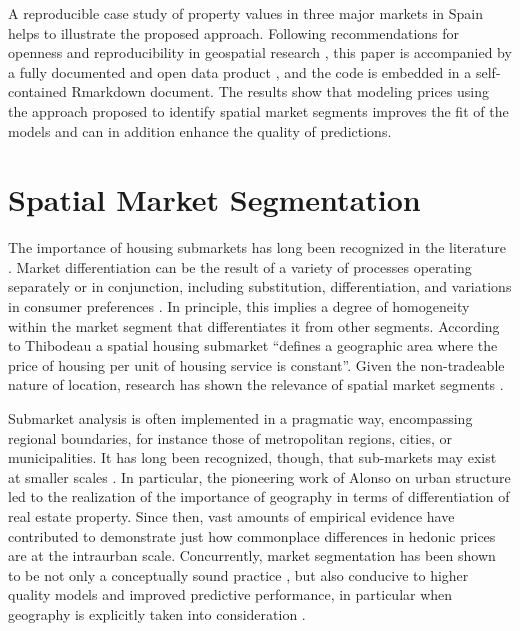 \documentclass[Royal,times,sageh]{sagej}
\begin{document}
A reproducible case study of property values in three major markets in
Spain helps to illustrate the proposed approach. Following
recommendations for openness and reproducibility in geospatial research
\citep{Paez2021open}, this paper is accompanied by a fully documented
and open data product \citep[see][]{arribas2021open}, and the code is
embedded in a self-contained Rmarkdown document. The results show that
modeling prices using the approach proposed to identify spatial market
segments improves the fit of the models and can in addition enhance the
quality of predictions.

\hypertarget{spatial-market-segmentation}{%
\section{Spatial Market
Segmentation}\label{spatial-market-segmentation}}

The importance of housing submarkets has long been recognized in the
literature \citep[e.g.][]{Rapkin1953housing}. Market differentiation can
be the result of a variety of processes operating separately or in
conjunction, including substitution, differentiation, and variations in
consumer preferences \citep{Galster1996william}. In principle, this
implies a degree of homogeneity within the market segment that
differentiates it from other segments. According to Thibodeau
\citeyearpar[pp.~4-5]{Thibodeau2003marking} a spatial housing submarket
``defines a geographic area where the price of housing per unit of
housing service is constant''. Given the non-tradeable nature of
location, research has shown the relevance of spatial market segments
\citep{Bourassa2007spatial, Royuela2013heuristic, Usman2020property}.

Submarket analysis is often implemented in a pragmatic way, encompassing
regional boundaries, for instance those of metropolitan regions, cities,
or municipalities. It has long been recognized, though, that sub-markets
may exist at smaller scales \citep[e.g.,][]{Rapkin1953housing}. In
particular, the pioneering work of Alonso \citep{Alonso1964location} on
urban structure led to the realization of the importance of geography in
terms of differentiation of real estate property. Since then, vast
amounts of empirical evidence have contributed to demonstrate just how
commonplace differences in hedonic prices are at the intraurban scale.
Concurrently, market segmentation has been shown to be not only a
conceptually sound practice \citep[see][]{Watkins2001definition}, but
also conducive to higher quality models and improved predictive
performance, in particular when geography is explicitly taken into
consideration \citep{Paez2008moving}.
\end{document}

